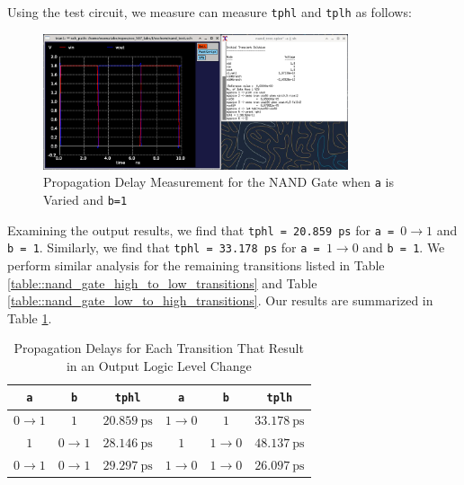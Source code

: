 \documentclass{article}
\begin{document}
	\noindent Using the test circuit, we measure can measure \texttt{tphl} and \texttt{tplh} as follows:
	
	\begin{figure}[H]
		\centerline{\includegraphics[width=0.8\textwidth]{nand_delay_sweep_va.png}}
		\caption{Propagation Delay Measurement for the NAND Gate when \texttt{a} is Varied and \texttt{b=1}}
		\label{fig::nand_delay_sweep_va}
	\end{figure}
	
	Examining the output results, we find that \texttt{tphl = 20.859 ps} for \texttt{a = }$0 \rightarrow 1$ and \texttt{b = 1}. Similarly, we find that \texttt{tphl = 33.178 ps} for \texttt{a = }$1 \rightarrow 0$ and \texttt{b = 1}. We perform similar analysis for the remaining transitions listed in Table \ref{table::nand_gate_high_to_low_transitions} and Table \ref{table::nand_gate_low_to_high_transitions}. Our results are summarized in Table \ref{table::nand_gate_delay_analysis}.
	
	\begin{table}[H]
	\begin{center}
	\caption{Propagation Delays for Each Transition That Result in an Output Logic Level Change}
	\label{table::nand_gate_delay_analysis}
	\begin{tabular}{| c | c | c || c | c | c |}
		\hline
		\texttt{a} & \texttt{b} & \texttt{tphl} & \texttt{a} & \texttt{b} & \texttt{tplh} \\
		\hline	
		$0 \rightarrow 1$ & $1$ & $20.859\ \text{ps}$ & $1 \rightarrow 0$ & $1$ & $33.178\ \text{ps}$\\
		\hline	
		$1$ & $0 \rightarrow 1$ & $28.146\ \text{ps}$ & $1$ & $1 \rightarrow 0$ & $48.137\ \text{ps}$\\
		\hline	
		$0 \rightarrow 1$ & $0 \rightarrow 1$ & $29.297\ \text{ps}$ & $1 \rightarrow 0$ & $1 \rightarrow 0$ & $26.097\ \text{ps}$\\
		\hline
	\end{tabular}
	\end{center}
	\end{table}
	
\end{document}
